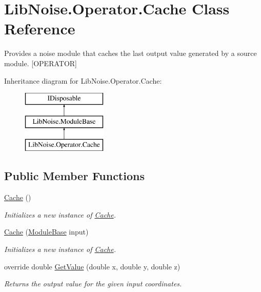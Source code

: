 \hypertarget{class_lib_noise_1_1_operator_1_1_cache}{}\section{Lib\+Noise.\+Operator.\+Cache Class Reference}
\label{class_lib_noise_1_1_operator_1_1_cache}


Provides a noise module that caches the last output value generated by a source module. \mbox{[}O\+P\+E\+R\+A\+T\+OR\mbox{]}  


Inheritance diagram for Lib\+Noise.\+Operator.\+Cache\+:\begin{figure}[H]
\begin{center}
\leavevmode
\includegraphics[height=3.000000cm]{class_lib_noise_1_1_operator_1_1_cache}
\end{center}
\end{figure}
\subsection*{Public Member Functions}
\begin{DoxyCompactItemize}
\item 
\hyperlink{class_lib_noise_1_1_operator_1_1_cache_a70bbc3a95ad9424f594499a431ddd6a7}{Cache} ()
\begin{DoxyCompactList}\small\item\em Initializes a new instance of \hyperlink{class_lib_noise_1_1_operator_1_1_cache}{Cache}. \end{DoxyCompactList}\item 
\hyperlink{class_lib_noise_1_1_operator_1_1_cache_afb77c238ebc943cf20c7a4b797d99038}{Cache} (\hyperlink{class_lib_noise_1_1_module_base}{Module\+Base} input)
\begin{DoxyCompactList}\small\item\em Initializes a new instance of \hyperlink{class_lib_noise_1_1_operator_1_1_cache}{Cache}. \end{DoxyCompactList}\item 
override double \hyperlink{class_lib_noise_1_1_operator_1_1_cache_aec2e48d54d3675a94034989eae1a9052}{Get\+Value} (double x, double y, double z)
\begin{DoxyCompactList}\small\item\em Returns the output value for the given input coordinates. \end{DoxyCompactList}\end{DoxyCompactItemize}

